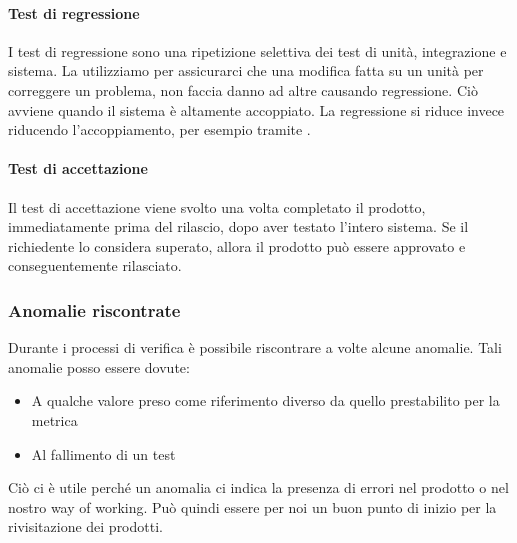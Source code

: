 			
			\paragraph{Test di regressione} \label{testregressione}
			I test di regressione sono una ripetizione selettiva dei test di unità, integrazione e sistema.
			La utilizziamo per assicurarci che una modifica fatta su un unità per correggere un problema, non faccia danno ad altre causando regressione.
			Ciò avviene quando il sistema è altamente accoppiato. 
			La regressione si riduce invece riducendo l'accoppiamento, per esempio tramite .
			
			\paragraph{Test di accettazione} \label{testaccettazione}
			Il test di accettazione viene svolto una volta completato il prodotto, immediatamente prima del rilascio, dopo aver testato l'intero sistema.
			Se il richiedente lo considera superato, allora il prodotto può essere approvato e conseguentemente rilasciato.
		
		
		\subsubsection{Anomalie riscontrate}\label{Anomalie}
		Durante i processi di verifica è possibile riscontrare a volte alcune anomalie.
		Tali anomalie posso essere dovute:
		\begin{itemize}
			\item A qualche valore preso come riferimento diverso da quello prestabilito per la metrica
			\item Al fallimento di un test
		\end{itemize}
		Ciò ci è utile perché un anomalia ci indica la presenza di errori nel prodotto o nel nostro way of working. Può quindi essere per noi un buon punto di inizio per la rivisitazione dei prodotti.
		
		
